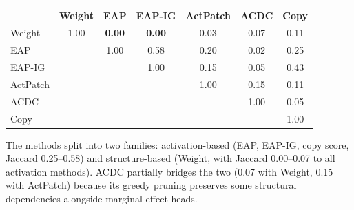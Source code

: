 \documentclass{article}
\newcommand{\NUM}[1]{\textbf{#1}}
\begin{document}
\begin{appendices}
\begin{table}[h]
\centering
\small
\begin{tabular}{lcccccc}
\toprule
& \textbf{Weight} & \textbf{EAP} & \textbf{EAP-IG} & \textbf{ActPatch} & \textbf{ACDC} & \textbf{Copy} \\
\midrule
Weight   & 1.00 & \NUM{0.00} & \NUM{0.00} & 0.03 & 0.07 & 0.11 \\
EAP      &      & 1.00 & 0.58 & 0.20 & 0.02 & 0.25 \\
EAP-IG   &      &      & 1.00 & 0.15 & 0.05 & 0.43 \\
ActPatch &      &      &      & 1.00 & 0.15 & 0.11 \\
ACDC     &      &      &      &      & 1.00 & 0.05 \\
Copy     &      &      &      &      &      & 1.00 \\
\bottomrule
\end{tabular}
\end{table}

The methods split into two families: activation-based
(EAP, EAP-IG, copy score, Jaccard 0.25--0.58) and structure-based
(Weight, with Jaccard 0.00--0.07 to all activation methods). ACDC
partially bridges the two (0.07 with Weight, 0.15 with
ActPatch) because its greedy pruning preserves some structural
dependencies alongside marginal-effect heads.

\end{appendices}
\end{document}
